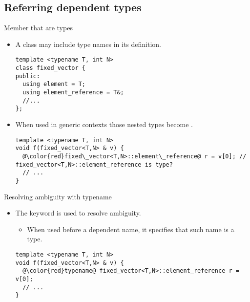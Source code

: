 \subsection{Referring dependent types}

\begin{frame}[t,fragile]{Member that are types}
\begin{itemize}
  \item A class may include type names in its definition.
\begin{lstlisting}
template <typename T, int N>
class fixed_vector {
public:
  using element = T;
  using element_reference = T&;
  //...
};
\end{lstlisting}

  \item When used in generic contexts those nested types become .
\begin{lstlisting}[escapechar=@]
template <typename T, int N>
void f(fixed_vector<T,N> & v) {
  @\color{red}fixed\_vector<T,N>::element\_reference@ r = v[0]; // fixed_vector<T,N>::element_reference is type?
  // ...
}
\end{lstlisting}
\end{itemize}
\end{frame}


\begin{frame}[t,fragile]{Resolving ambiguity with typename}
\begin{itemize}
  \item The keyword  is used to resolve ambiguity.
    \begin{itemize}
      \item When used before a dependent name, it specifies that such name is a type.
    \end{itemize}
\begin{lstlisting}[escapechar=@]
template <typename T, int N>
void f(fixed_vector<T,N> & v) {
  @\color{red}typename@ fixed_vector<T,N>::element_reference r = v[0]; 
  // ...
}
\end{lstlisting}

\end{itemize}
\end{frame}
